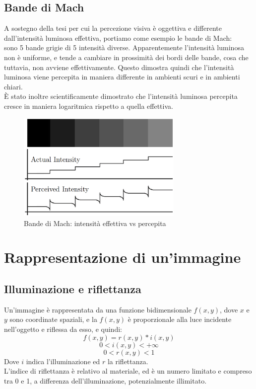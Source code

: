 \documentclass{report}
\begin{document}
\section{Bande di Mach}
A sostegno della tesi per cui la percezione visiva è oggettiva e differente \\dall'intensità luminosa effettiva, portiamo come esempio le bande di Mach:\\
sono 5 bande grigie di 5 intensità diverse. Apparentemente l'intensità luminosa non è uniforme, e tende a cambiare in prossimità dei bordi delle bande, cosa che tuttavia, non avviene effettivamente.
Questo dimostra quindi che l'intensità luminosa viene percepita in maniera differente in ambienti scuri e in ambienti chiari.\\
È stato inoltre scientificamente dimostrato che l'intensità luminosa percepita cresce in maniera logaritmica rispetto a quella effettiva.
\begin{figure}[htp]
	\centering
	\includegraphics[width=8cm]{bandeDiMach.jpg}
	\caption{Bande di Mach: intensità effettiva vs percepita}
\end{figure}
\newpage
\chapter{Rappresentazione di un'immagine}
\section{Illuminazione e riflettanza}
Un'immagine è rappresentata da una funzione bidimensionale $f(x,y)$, dove $x$ e $y$ sono coordinate spaziali, e la $f(x, y)$ è proporzionale alla luce incidente nell'oggetto e riflessa da esso, e quindi:
$$f(x,y) = r(x,y) * i(x,y)$$
$$0 < i(x, y) < +\infty $$
$$ 0 < r(x,y) < 1 $$
Dove $i$ indica l'illuminazione ed $r$ la riflettanza.\\L'indice di riflettanza è relativo al materiale, ed è un numero limitato e compreso tra 0 e 1, a differenza dell'illuminazione, potenzialmente illimitato.
\end{document}
